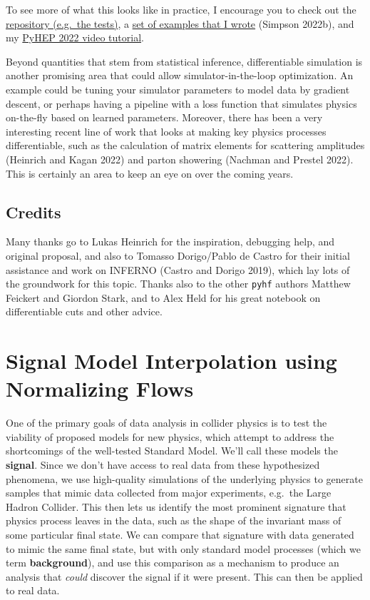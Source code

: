 \documentclass[
  11pt,
  numbers=noendperiod]{book}
\begin{document}
To see more of what this looks like in practice, I encourage you to
check out the \href{http://github.com/gradhep/relaxed}{repository
(e.g.~the tests)}, a
\href{http://github.com/phinate/differentiable-analysis-examples}{set of
examples that I wrote} (Simpson 2022b), and my
\href{https://youtu.be/cOv7W-moO6k}{PyHEP 2022 video tutorial}.

Beyond quantities that stem from statistical inference, differentiable
simulation is another promising area that could allow
simulator-in-the-loop optimization. An example could be tuning your
simulator parameters to model data by gradient descent, or perhaps
having a pipeline with a loss function that simulates physics on-the-fly
based on learned parameters. Moreover, there has been a very interesting
recent line of work that looks at making key physics processes
differentiable, such as the calculation of matrix elements for
scattering amplitudes (Heinrich and Kagan 2022) and parton showering
(Nachman and Prestel 2022). This is certainly an area to keep an eye on
over the coming years.

\hypertarget{credits}{%
\section{Credits}\label{credits}}

Many thanks go to Lukas Heinrich for the inspiration, debugging help,
and original proposal, and also to Tomasso Dorigo/Pablo de Castro for
their initial assistance and work on INFERNO (Castro and Dorigo 2019),
which lay lots of the groundwork for this topic. Thanks also to the
other \texttt{pyhf} authors Matthew Feickert and Giordon Stark, and to
Alex Held for his great notebook on differentiable cuts and other
advice.

\hypertarget{sec-flow-interp}{%
\chapter{Signal Model Interpolation using Normalizing
Flows}\label{sec-flow-interp}}

One of the primary goals of data analysis in collider physics is to test
the viability of proposed models for new physics, which attempt to
address the shortcomings of the well-tested Standard Model. We'll call
these models the \textbf{signal}. Since we don't have access to real
data from these hypothesized phenomena, we use high-quality simulations
of the underlying physics to generate samples that mimic data collected
from major experiments, e.g.~the Large Hadron Collider. This then lets
us identify the most prominent signature that physics process leaves in
the data, such as the shape of the invariant mass of some particular
final state. We can compare that signature with data generated to mimic
the same final state, but with only standard model processes (which we
term \textbf{background}), and use this comparison as a mechanism to
produce an analysis that \emph{could} discover the signal if it were
present. This can then be applied to real data.
\end{document}
